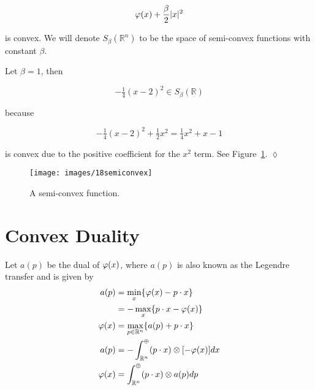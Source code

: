 \begin{equation*}
\varphi(x) + \frac{\beta}{2}|x|^2
\end{equation*}

is convex.
We will denote $S_\beta(\mathbb{R}^n)$ to be the space of semi-convex functions with constant $\beta$.

\begin{example}
Let $\beta=1$, then

\begin{equation*}
-\tfrac{1}{4}{(x-2)}^2\in S_\beta(\mathbb{R})
\end{equation*}

because

\begin{equation*}
-\tfrac{1}{4}{(x-2)}^2 + \tfrac{1}{2}x^2 = \tfrac{1}{4}x^2 + x - 1
\end{equation*}

is convex due to the positive coefficient for the $x^2$ term.
See Figure~\ref{fig:18semiconvex}.
$\lozenge$
\end{example}

\begin{figure}[ht!]
\centering
\texttt{[image: images/18semiconvex]}
\caption{A semi-convex function.}%
\label{fig:18semiconvex}
\end{figure}

\section{Convex Duality}
Let $a(p)$ be the dual of $\varphi(x)$, where $a(p)$ is also known as the Legendre transfer and is given by
\begin{align*}
a(p) &= \min_x\{\varphi(x)-p\cdot x\} \\
&= -\max_x\{p\cdot x-\varphi(x)\} \\
\varphi(x) &= \max_{p\in\mathbb{R}^n}\{a(p)+p\cdot x\} \\
a(p) &= -\int_{\mathbb{R}^n}^\oplus (p\cdot x)\otimes[-\varphi(x)]dx \\
\varphi(x) &= \int_{\mathbb{R}^n}^\oplus (p\cdot x)\otimes a(p)dp
\end{align*}

